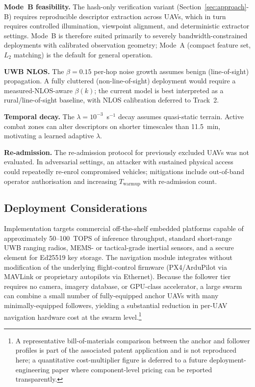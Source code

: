 \documentclass[conference,10pt]{IEEEtran}
\begin{document}
\textbf{Mode~B feasibility.} The hash-only verification variant (Section~\ref{sec:approach}-B) requires reproducible descriptor extraction across UAVs, which in turn requires controlled illumination, viewpoint alignment, and deterministic extractor settings. Mode~B is therefore suited primarily to severely bandwidth-constrained deployments with calibrated observation geometry; Mode~A (compact feature set, $L_2$ matching) is the default for general operation.

\textbf{UWB NLOS.} The $\beta{=}0.15$ per-hop noise growth assumes benign (line-of-sight) propagation. A fully cluttered (non-line-of-sight) deployment would require a measured-NLOS-aware $\beta(k)$; the current model is best interpreted as a rural/line-of-sight baseline, with NLOS calibration deferred to Track~2.

\textbf{Temporal decay.} The $\lambda = 10^{-3}$~s$^{-1}$ decay assumes quasi-static terrain. Active combat zones can alter descriptors on shorter timescales than 11.5~min, motivating a learned adaptive $\lambda$.

\textbf{Re-admission.} The re-admission protocol for previously excluded UAVs was not evaluated. In adversarial settings, an attacker with sustained physical access could repeatedly re-enrol compromised vehicles; mitigations include out-of-band operator authorisation and increasing $T_\text{warmup}$ with re-admission count.

\subsection{Deployment Considerations}

Implementation targets commercial off-the-shelf embedded platforms capable of approximately 50--100~TOPS of inference throughput, standard short-range UWB ranging radios, MEMS- or tactical-grade inertial sensors, and a secure element for Ed25519 key storage. The navigation module integrates without modification of the underlying flight-control firmware (PX4/ArduPilot via MAVLink or proprietary autopilots via Ethernet). Because the follower tier requires no camera, imagery database, or GPU-class accelerator, a large swarm can combine a small number of fully-equipped anchor UAVs with many minimally-equipped followers, yielding a substantial reduction in per-UAV navigation hardware cost at the swarm level.\footnote{A representative bill-of-materials comparison between the anchor and follower profiles is part of the associated patent application and is not reproduced here; a quantitative cost-multiplier figure is deferred to a future deployment-engineering paper where component-level pricing can be reported transparently.}
\end{document}
